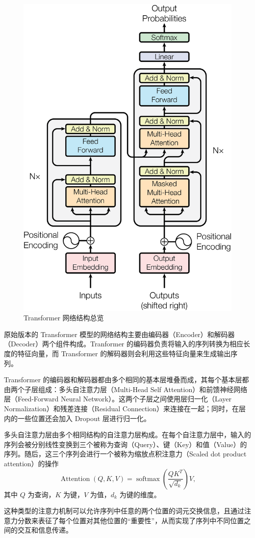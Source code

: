 \begin{figure}[h]
  \centering
  \includegraphics[width=0.5\linewidth]{figures/Transformer-Arch.png}
  \caption{Transformer 网络结构总览\cite{Vaswani2017AttentionIA}}
  \label{fig:transformer_overview}
\end{figure}


原始版本的 Transformer 模型的网络结构主要由编码器（Encoder）和解码器（Decoder）两个组件构成。Tranformer 的编码器负责将输入的序列转换为相应长度的特征向量，而 Transformer 的解码器则会利用这些特征向量来生成输出序列。

Transformer 的编码器和解码器都由多个相同的基本层堆叠而成，其每个基本层都由两个子层组成：多头自注意力层（Multi-Head Self Attention）和前馈神经网络层（Feed-Forward Neural Network）。这两个子层之间使用层归一化（Layer Normalization）和残差连接（Residual Connection）来连接在一起；同时，在层内的一些位置还会加入 Dropout 层进行归一化。

多头自注意力层由多个相同结构的自注意力层构成。在每个自注意力层中，输入的序列会被分别线性变换到三个被称为查询（Query）、键（Key）和值（Value）的序列。随后，这三个序列会进行一个被称为缩放点积注意力（Scaled dot product attention）的操作
$$
\operatorname{Attention}(Q, K, V) = \operatorname{softmax}\left(\frac{Q K^T}{\sqrt{d_k}}\right)V,
$$
其中 $Q$ 为查询，$K$ 为键，$V$ 为值，$d_k$ 为键的维度。

这种类型的注意力机制可以允许序列中任意的两个位置的词元交换信息，且通过注意力分数来表征了每个位置对其他位置的“重要性”，从而实现了序列中不同位置之间的交互和信息传递。

